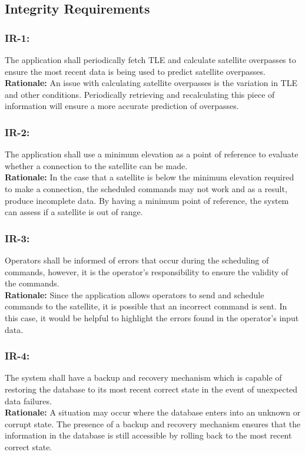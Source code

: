 \documentclass[12pt]{article}
\begin{document}
\subsection{Integrity Requirements}
\subsubsection*{IR-1:}
The application shall periodically fetch TLE and calculate satellite overpasses to ensure the most recent data is being used to predict satellite overpasses. \\ 
\textbf{Rationale:} An issue with calculating satellite overpasses is the variation in TLE and other conditions. Periodically retrieving and recalculating this piece of information will ensure a more accurate prediction of overpasses.

\subsubsection*{IR-2:}
The application shall use a minimum elevation as a point of reference to evaluate whether a connection to the satellite can be made. \\
\textbf{Rationale:} In the case that a satellite is below the minimum elevation required to make a connection, the scheduled commands may not work and as a result, produce incomplete data. By having a minimum point of reference, the system can assess if a satellite is out of range.

\subsubsection*{IR-3:}
Operators shall be informed of errors that occur during the scheduling of commands, however, it is the operator’s responsibility to ensure the validity of the commands. \\
\textbf{Rationale:} Since the application allows operators to send and schedule commands to the satellite, it is possible that an incorrect command is sent.  In this case, it would be helpful to highlight the errors found in the operator’s input data.

\subsubsection*{IR-4:}
The system shall have a backup and recovery mechanism which is capable of restoring the database to its most recent correct state in the event of unexpected data failures. \\
\textbf{Rationale:} A situation may occur where the database enters into an unknown or corrupt state. The presence of a backup and recovery mechanism ensures that the information in the database is still accessible by rolling back to the most recent correct state.
\end{document}
